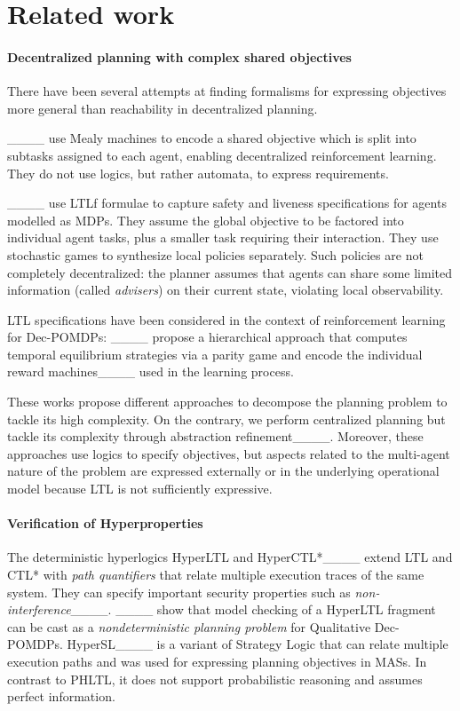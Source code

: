 \section{Related work}
\paragraph{Decentralized planning with complex shared objectives}

There have been several attempts at finding formalisms for expressing objectives more general than reachability in decentralized planning.

____ use Mealy machines to encode a shared objective which is split into subtasks assigned to each agent, enabling decentralized reinforcement learning.
They do not use logics, but rather automata, to express requirements.

____ use \ac{LTLf} formulae to capture safety and liveness specifications for agents modelled as \acp{MDP}.
They assume the global objective to be factored into individual agent tasks, plus a smaller task requiring their interaction.
They use stochastic games to synthesize local policies separately.
Such policies are not completely decentralized:
the planner assumes that agents can share some limited information (called \emph{advisers}) on their current state, violating local observability.

\acs{LTL} specifications have been considered in the context of reinforcement learning for \acp{Dec-POMDP}:
____ propose a hierarchical approach that computes temporal equilibrium strategies
via a parity game and encode the individual reward machines____ used in the learning process.    

These works propose different approaches to decompose the planning problem to tackle its high complexity.
On the contrary, we perform centralized planning but tackle its complexity through abstraction refinement____.
Moreover, these approaches use logics to specify objectives, but aspects related to the multi-agent nature of the problem are expressed externally or in the underlying operational model because \acs{LTL} is not sufficiently expressive.

\vspace{-5pt}
\paragraph{Verification of Hyperproperties}
The deterministic hyperlogics HyperLTL and HyperCTL*____
extend \acs{LTL} and CTL* with \emph{path quantifiers} that relate multiple execution traces of the same system.
They can specify important security properties such as \emph{non-interference}____.
____ show that model checking of a HyperLTL fragment can be cast as a \emph{nondeterministic planning problem} for Qualitative \acp{Dec-POMDP}.
HyperSL____ is a variant of Strategy Logic that can relate multiple execution paths
and was used for expressing planning objectives in \acp{MAS}.
In contrast to \acs{PHLTL}, it does not support probabilistic reasoning and assumes perfect information.

